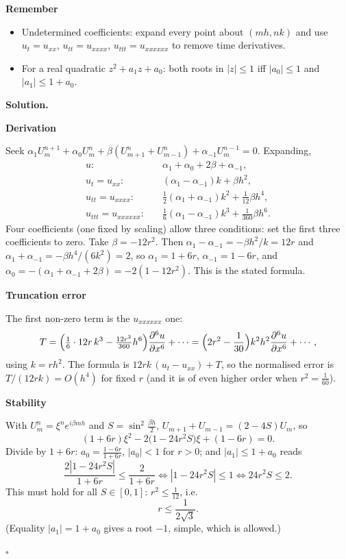 \documentclass[11pt,a4paper]{article}
\newenvironment{rem}
  {\begin{remember}\noindent\textbf{Remember}\par\nobreak\vspace{-0.3em}}
  {\end{remember}}
\newenvironment{solution}
  {\par\noindent\textbf{Solution.}\par\nobreak}
  {\par\nobreak\noindent\hfill\(\square\)\par}
\newcommand{\step}[1]{\par\addvspace{0.5em}\noindent\textbf{#1}\par\nobreak}
\begin{document}
\begin{rem}
\begin{itemize}
  \item Undetermined coefficients: expand every point about
    \((mh,nk)\) and use \(u_t=u_{xx}\), \(u_{tt}=u_{xxxx}\),
    \(u_{ttt}=u_{xxxxxx}\) to remove time derivatives.
  \item For a real quadratic \(z^2+a_1z+a_0\): both roots in
    \(|z|\le1\) iff \(|a_0|\le1\) and \(|a_1|\le1+a_0\).
\end{itemize}
\end{rem}

\begin{solution}
\step{Derivation}
Seek \(\alpha_1U_m^{n+1}+\alpha_0U_m^n+\beta(U_{m+1}^n+U_{m-1}^n)+\alpha_{-1}U_m^{n-1}=0\).
Expanding,
\begin{align*}
  u:&\quad \alpha_1+\alpha_0+2\beta+\alpha_{-1},\\
  u_t=u_{xx}:&\quad (\alpha_1-\alpha_{-1})k+\beta h^2,\\
  u_{tt}=u_{xxxx}:&\quad \tfrac12(\alpha_1+\alpha_{-1})k^2+\tfrac1{12}\beta h^4,\\
  u_{ttt}=u_{xxxxxx}:&\quad \tfrac16(\alpha_1-\alpha_{-1})k^3+\tfrac1{360}\beta h^6 .
\end{align*}
Four coefficients (one fixed by scaling) allow three conditions: set
the first three coefficients to zero.  Take \(\beta=-12r^2\).  Then
\(\alpha_1-\alpha_{-1}=-\beta h^2/k=12r\) and
\(\alpha_1+\alpha_{-1}=-\beta h^4/(6k^2)=2\), so
\(\alpha_1=1+6r\), \(\alpha_{-1}=1-6r\), and
\(\alpha_0=-(\alpha_1+\alpha_{-1}+2\beta)=-2(1-12r^2)\).  This is the
stated formula.

\step{Truncation error}
The first non-zero term is the \(u_{xxxxxx}\) one:
\[
  T=\Bigl(\tfrac16\cdot12r\,k^3-\tfrac{12r^2}{360}h^6\Bigr)\frac{\partial^6u}{\partial x^6}+\cdots
  =\Bigl(2r^2-\frac1{30}\Bigr)k^2h^2\frac{\partial^6u}{\partial x^6}+\cdots,
\]
using \(k=rh^2\).  The formula is \(12rk\,(u_t-u_{xx})+T\), so the
normalised error is \(T/(12rk)=O(h^4)\) for fixed \(r\) (and it is of
even higher order when \(r^2=\frac1{60}\)).

\step{Stability}
With \(U_m^n=\xi^ne^{i\beta mh}\) and \(S=\sin^2\frac{\beta h}2\),
\(U_{m+1}+U_{m-1}=(2-4S)U_m\), so
\[
  (1+6r)\xi^2-2\bigl(1-24r^2S\bigr)\xi+(1-6r)=0 .
\]
Divide by \(1+6r\): \(a_0=\frac{1-6r}{1+6r}\), \(|a_0|<1\) for \(r>0\);
and \(|a_1|\le1+a_0\) reads
\[
  \frac{2|1-24r^2S|}{1+6r}\le\frac2{1+6r}\iff|1-24r^2S|\le1\iff24r^2S\le2 .
\]
This must hold for all \(S\in[0,1]\): \(r^2\le\frac1{12}\), i.e.\
\[
  \boxed{r\le\frac1{2\sqrt3}}.
\]
(Equality \(|a_1|=1+a_0\) gives a root \(-1\), simple, which is
allowed.)
\end{solution}
\end{document}
